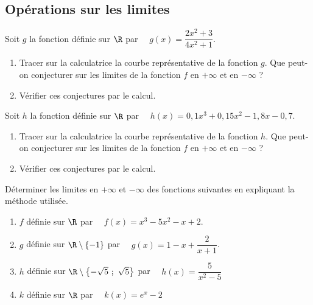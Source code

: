 \documentclass[a4paper,11pt,exos]{nsi} %
\begin{document}





\subsection*{Opérations sur les limites}

\exo{}
Soit $g$ la fonction définie sur $\R$ par $\quad g(x)=\dfrac{2x^2+3}{4x^2+1}$.
\begin{enumerate}
	\item \faCalculator \hspace*{.3cm} Tracer sur la calculatrice la courbe représentative de la fonction $g$. Que peut-on conjecturer sur les limites de la fonction $f$ en $+\infty$ et en $-\infty$ ?
	\item Vérifier ces conjectures par le calcul.
\end{enumerate}



\exo{}
Soit $h$ la fonction définie sur $\R$ par $\quad h(x)=0,1x^3+0,15x^2-1,8x-0,7$.
\begin{enumerate}
	\item \faCalculator \hspace*{.3cm} Tracer sur la calculatrice la courbe représentative de la fonction $h$. Que peut-on conjecturer sur les limites de la fonction $f$ en $+\infty$ et en $-\infty$ ?
	\item Vérifier ces conjectures par le calcul.
\end{enumerate}


\exo{}
Déterminer les limites en $+\infty$ et $-\infty$ des fonctions suivantes en expliquant la méthode utilisée.
	\begin{enumerate}
		\item $f$ définie sur $\R$ par $\quad f(x)=x^3-5x^2-x+2$.
		\item $g$ définie sur $\R\setminus \{-1\}$ par $\quad g(x)= 1-x+\dfrac{2}{x+1}$.
		\item $h$ définie sur $\R\setminus\left\{-\sqrt{5}\ ;\ \sqrt{5} \right\}$ par $\quad h(x)=\dfrac{5}{x^2-5}$
		\item $k$ définie sur $\R$ par $\quad k(x)=e^x-2$
	\end{enumerate}
\end{document}
